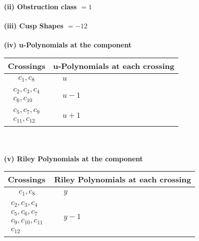\documentclass[1p]{elsarticle_modified}
\theoremstyle{definition}
\begin{document}
\flushleft \textbf{(ii) Obstruction class $= 1$}\\~\\
\flushleft \textbf{(iii) Cusp Shapes $= -12$}\\~\\
\newpage\renewcommand{\arraystretch}{1}
\flushleft \textbf{(iv) u-Polynomials at the component}\newline \\
\begin{tabular}{m{50pt}|m{274pt}}
Crossings & \hspace{64pt}u-Polynomials at each crossing \\
\hline $$\begin{aligned}c_{1},c_{8}\end{aligned}$$&$\begin{aligned}
&u
\end{aligned}$\\
\hline $$\begin{aligned}c_{2},c_{3},c_{4}\\c_{6},c_{10}\end{aligned}$$&$\begin{aligned}
&u-1
\end{aligned}$\\
\hline $$\begin{aligned}c_{5},c_{7},c_{9}\\c_{11},c_{12}\end{aligned}$$&$\begin{aligned}
&u+1
\end{aligned}$\\
\hline
\end{tabular}\\~\\
\newpage\renewcommand{\arraystretch}{1}
\flushleft \textbf{(v) Riley Polynomials at the component}\newline \\
\begin{tabular}{m{50pt}|m{274pt}}
Crossings & \hspace{64pt}Riley Polynomials at each crossing \\
\hline $$\begin{aligned}c_{1},c_{8}\end{aligned}$$&$\begin{aligned}
&y
\end{aligned}$\\
\hline $$\begin{aligned}c_{2},c_{3},c_{4}\\c_{5},c_{6},c_{7}\\c_{9},c_{10},c_{11}\\c_{12}\end{aligned}$$&$\begin{aligned}
&y-1
\end{aligned}$\\
\hline
\end{tabular}\\~\\
\end{document}

